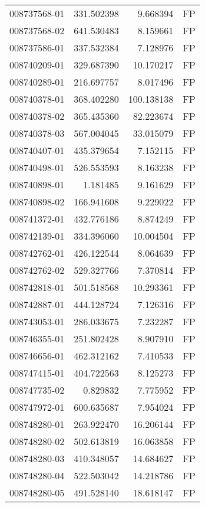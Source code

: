 \begin{tabular}{lrrl}
008737568-01 &  331.502398 &     9.668394 &   FP \\
008737568-02 &  641.530483 &     8.159661 &   FP \\
008737586-01 &  337.532384 &     7.128976 &   FP \\
008740209-01 &  329.687390 &    10.170217 &   FP \\
008740289-01 &  216.697757 &     8.017496 &   FP \\
008740378-01 &  368.402280 &   100.138138 &   FP \\
008740378-02 &  365.435360 &    82.223674 &   FP \\
008740378-03 &  567.004045 &    33.015079 &   FP \\
008740407-01 &  435.379654 &     7.152115 &   FP \\
008740498-01 &  526.553593 &     8.163238 &   FP \\
008740898-01 &    1.181485 &     9.161629 &   FP \\
008740898-02 &  166.941608 &     9.229022 &   FP \\
008741372-01 &  432.776186 &     8.874249 &   FP \\
008742139-01 &  334.396060 &    10.004504 &   FP \\
008742762-01 &  426.122544 &     8.064639 &   FP \\
008742762-02 &  529.327766 &     7.370814 &   FP \\
008742818-01 &  501.518568 &    10.293361 &   FP \\
008742887-01 &  444.128724 &     7.126316 &   FP \\
008743053-01 &  286.033675 &     7.232287 &   FP \\
008746355-01 &  251.802428 &     8.907910 &   FP \\
008746656-01 &  462.312162 &     7.410533 &   FP \\
008747415-01 &  404.722563 &     8.125273 &   FP \\
008747735-02 &    0.829832 &     7.775952 &   FP \\
008747972-01 &  600.635687 &     7.954024 &   FP \\
008748280-01 &  263.922470 &    16.206144 &   FP \\
008748280-02 &  502.613819 &    16.063858 &   FP \\
008748280-03 &  410.348057 &    14.684627 &   FP \\
008748280-04 &  522.503042 &    14.218786 &   FP \\
008748280-05 &  491.528140 &    18.618147 &   FP \\

\end{tabular}
